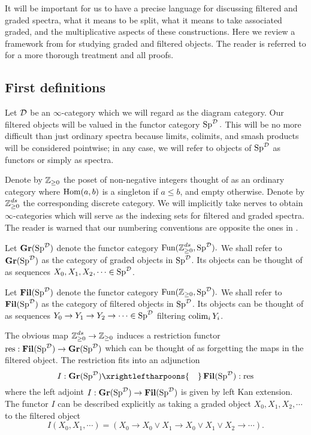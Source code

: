 
It will be important for us to have a precise language for discussing filtered and graded spectra, what it means to be split, what it means to take associated graded, and the multiplicative aspects of these constructions. Here we review a framework from \cite{LurieRot} for studying graded and filtered objects.  The reader is referred to \cite{LurieRot} for a more thorough treatment and all proofs.  

\subsection{First definitions}
Let $\operatorname{\mathcal{D}}$ be an $\infty$-category which we will regard as the diagram category.  Our filtered objects will be valued in the functor category $\operatorname{\mathrm{Sp}}^{\operatorname{\mathcal{D}}}.$  This will be no more difficult than just ordinary spectra because limits, colimits, and smash products will be considered pointwise; in any case, we will refer to objects of $\operatorname{\mathrm{Sp}}^{\operatorname{\mathcal{D}}}$ as functors or simply as spectra.  

Denote by $\operatorname{\mathbb{Z}}_{\geq 0}$ the poset of non-negative integers thought of as an ordinary category where $\operatorname{\text{Hom}}(a,b)$ is a singleton if $a\leq b$, and empty otherwise.  Denote by $\operatorname{\mathbb{Z}}_{\geq 0}^{ds}$ the corresponding discrete category.  We will implicitly take nerves to obtain $\infty$-categories which will serve as the indexing sets for filtered and graded spectra.  The reader is warned that our numbering conventions are opposite the ones in \cite{LurieRot}.

\begin{dfn} 
Let $\operatorname{\mathbf{Gr}}(\operatorname{\mathrm{Sp}}^{\operatorname{\mathcal{D}}})$ denote the functor category $\operatorname{\text{Fun}}(\operatorname{\mathbb{Z}}_{\geq 0}^{ds}, \operatorname{\mathrm{Sp}}^{\operatorname{\mathcal{D}}}).$  We shall refer to $\operatorname{\mathbf{Gr}}(\operatorname{\mathrm{Sp}}^{\operatorname{\mathcal{D}}})$ as the category of graded objects in $\operatorname{\mathrm{Sp}}^{\operatorname{\mathcal{D}}}$.  Its objects can be thought of as sequences $X_0, X_1,X_2,\cdots \in \operatorname{\mathrm{Sp}}^{\operatorname{\mathcal{D}}}$.
\end{dfn}

\begin{dfn} 
Let $\operatorname{\mathbf{Fil}}(\operatorname{\mathrm{Sp}}^{\operatorname{\mathcal{D}}})$ denote the functor category $\operatorname{\text{Fun}}(\operatorname{\mathbb{Z}}_{\geq 0}, \operatorname{\mathrm{Sp}}^{\operatorname{\mathcal{D}}}).$  We shall refer to $\operatorname{\mathbf{Fil}}(\operatorname{\mathrm{Sp}}^{\operatorname{\mathcal{D}}})$ as the category of filtered objects in $\operatorname{\mathrm{Sp}}^{\operatorname{\mathcal{D}}}$.  Its objects can be thought of as sequences $Y_0\to Y_1\to Y_2 \to \cdots \in \operatorname{\mathrm{Sp}}^{\operatorname{\mathcal{D}}}$ filtering $\operatorname*{\mathrm{colim}}_i Y_i$.  
\end{dfn}


The obvious map $\operatorname{\mathbb{Z}}_{\geq 0}^{ds} \to \operatorname{\mathbb{Z}}_{\geq 0}$ induces a restriction functor $\text{res}: \operatorname{\mathbf{Fil}}(\operatorname{\mathrm{Sp}}^{\operatorname{\mathcal{D}}}) \to \operatorname{\mathbf{Gr}}(\operatorname{\mathrm{Sp}}^{\operatorname{\mathcal{D}}})$ which can be thought of as forgetting the maps in the filtered object.  The restriction fits into an adjunction  
$$I:\Gr(\Sp^{\D}) \xrightleftharpoons{\quad} \Fil(\Sp^{\D}) : \text{res}$$
where the left adjoint $I: \operatorname{\mathbf{Gr}}(\operatorname{\mathrm{Sp}}^{\operatorname{\mathcal{D}}}) \to \operatorname{\mathbf{Fil}}(\operatorname{\mathrm{Sp}}^{\operatorname{\mathcal{D}}})$ is given by left Kan extension.  The functor $I$ can be described explicitly as taking a graded object $X_0,X_1,X_2,\cdots$ to the filtered object $$I(X_0, X_1, \cdots) = (X_0\to X_0 \vee X_1\to X_0 \vee X_1 \vee X_2\to \cdots).$$   

